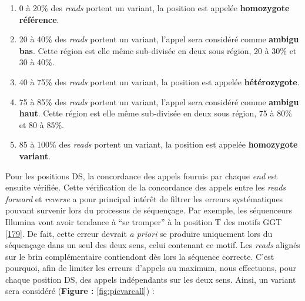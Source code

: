 \documentclass[12pt,twoside]{reedthesis}
\providecommand{\tightlist}{%
  \setlength{\itemsep}{0pt}\setlength{\parskip}{0pt}}
\theoremstyle{definition}
\theoremstyle{definition}
\theoremstyle{remark}
\begin{document}
  \begin{enumerate}
  \def\labelenumi{\arabic{enumi}.}
  \tightlist
  \item
    0 à 20\% des \emph{reads} portent un variant, la position est appelée
    \textbf{homozygote référence}.\\
  \item
    20 à 40\% des \emph{reads} portent un variant, l'appel sera considéré
    comme \textbf{ambigu bas}. Cette région est elle même sub-divisée en
    deux sous région, 20 à 30\% et 30 à 40\%.\\
  \item
    40 à 75\% des \emph{reads} portent un variant, la position est appelée
    \textbf{hétérozygote}.\\
  \item
    75 à 85\% des \emph{reads} portent un variant, l'appel sera considéré
    comme \textbf{ambigu haut}. Cette région est elle même sub-divisée en
    deux sous région, 75 à 80\% et 80 à 85\%.\\
  \item
    85 à 100\% des \emph{reads} portent un variant, la position est
    appelée \textbf{homozygote variant}.
  \end{enumerate}
  
  Pour les positions DS, la concordance des appels fournis par chaque
  \emph{end} est ensuite vérifiée. Cette vérification de la concordance
  des appels entre les \emph{reads forward} et \emph{reverse} a pour
  principal intérêt de filtrer les erreurs systématiques pouvant survenir
  lors du processus de séquençage. Par exemple, les séquenceurs Illumina
  vont avoir tendance à ``se tromper'' à la position T des motifs GGT
  {[}\protect\hyperlink{ref-Robinson2011}{179}{]}. De fait, cette erreur
  devrait \emph{a priori} se produire uniquement lors du séquençage dans
  un seul des deux sens, celui contenant ce motif. Les \emph{reads}
  alignés sur le brin complémentaire contiendont dès lors la séquence
  correcte. C'est pourquoi, afin de limiter les erreurs d'appels au
  maximum, nous effectuons, pour chaque position DS, des appels
  indépendants sur les deux sens. Ainsi, un variant sera considéré
  (\textbf{Figure : }\ref{fig:picvarcall}) :
  
\end{document}
